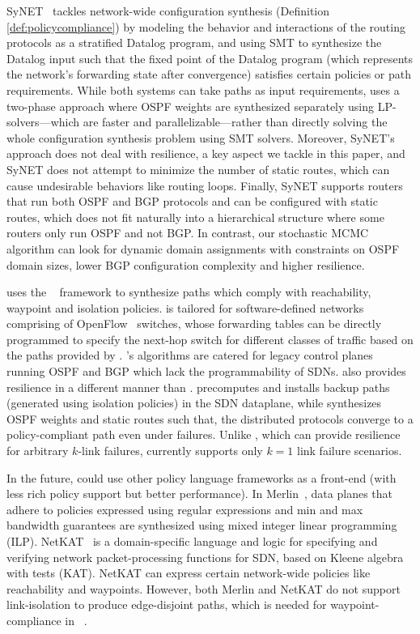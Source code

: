 SyNET~\cite{synet} tackles network-wide configuration synthesis
(Definition \ref{def:policycompliance}) by
modeling the behavior and interactions of the routing protocols as a
stratified Datalog program, and using SMT to synthesize the Datalog
input such that the fixed point of the Datalog program (which
represents the network's forwarding state after convergence) 
satisfies certain policies or path requirements.  While
both systems can take paths as input requirements, \name uses
a two-phase approach where OSPF weights are synthesized
separately using
LP-solvers---which are faster and parallelizable---rather than directly  
solving the whole configuration synthesis problem using SMT solvers.  
Moreover, SyNET's approach
does not deal with resilience, a key aspect we tackle in this paper,
and SyNET does not attempt to minimize the number of static routes,
which can cause undesirable behaviors like routing loops.  
Finally, SyNET supports routers that run both OSPF and BGP protocols and can be
configured with static routes, which does not fit naturally into a
hierarchical structure where some routers only run OSPF and not
BGP. In contrast, our stochastic MCMC algorithm can look for dynamic domain
assignments with constraints on OSPF domain sizes, lower 
BGP configuration complexity and higher resilience.

\name uses the \genesis~\cite{genesis} framework
to synthesize paths which comply with reachability, 
waypoint and isolation policies. \genesis is tailored
for software-defined networks comprising of 
OpenFlow~\cite{openflow} switches, whose
forwarding tables can be directly programmed to specify the next-hop
switch for different classes of traffic based on the paths provided
by \genesis. \name's algorithms are catered for legacy control planes 
running OSPF and BGP which lack the programmability of SDNs. \genesis also
provides resilience in a different manner than \name. 
\genesis precomputes and installs backup paths (generated using isolation policies) 
in the SDN dataplane, while \name synthesizes OSPF
weights and static routes such that, 
the distributed protocols converge to a
policy-compliant path even under failures. 
Unlike \genesis, which can provide resilience for arbitrary $k$-link failures, 
\name currently supports only $k=1$ link failure scenarios.

In the future, \name could use
other policy language frameworks as a front-end (with 
less rich policy support but better
performance). %
In Merlin~\cite{merlin}, data planes that adhere to policies expressed
using regular expressions and min and max
bandwidth guarantees are synthesized using mixed
integer linear programming (ILP). 
NetKAT~\cite{netkat} is a domain-specific language and logic for 
specifying and verifying network packet-processing functions
for SDN, based on Kleene algebra with tests (KAT). NetKAT can  
express certain network-wide policies like reachability and waypoints.
However, both Merlin and NetKAT do not support link-isolation 
to produce edge-disjoint paths, which is needed 
for waypoint-compliance in ~.


